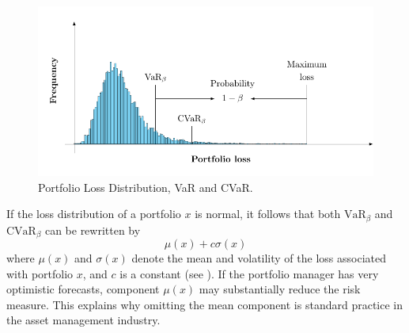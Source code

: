 \begin{figure}[!h]
	\centering
	\includegraphics{figures/VarCvar.pdf}
	\caption{Portfolio Loss Distribution, VaR and CVaR.}
	\label{fig:VarCvar}
\end{figure}

\begin{remark}\normalfont\label{re:Normal}
If the loss distribution of a portfolio $x$ is normal, it follows that both $\mbox{VaR}_\beta$ and $\mbox{CVaR}_\beta$ can be rewritten by
\[
	\mu(x)+c\sigma(x)
\]
where $\mu(x)$ and $\sigma(x)$ denote the mean and volatility of the loss associated with portfolio $x$, and $c$ is a constant (see \cite[Chapter 2]{Roncalli2014}). If the portfolio manager has very optimistic forecasts, component $\mu(x)$ may substantially reduce the risk measure. This explains why omitting the mean component is standard practice in the asset management industry.
\end{remark}

